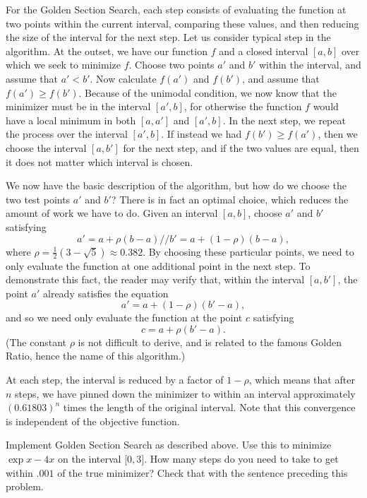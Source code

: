 For the Golden Section Search, each step consists of evaluating the function at two 
points within the current interval, comparing these values, and then reducing the size 
of the interval for the next step. Let us consider typical step in the algorithm. At 
the outset, we have our function $f$ and a closed interval $[a, b]$ over which we seek 
to minimize $f$. Choose two points $a'$ and $b'$ within the interval, and assume that 
$a' < b'$. Now calculate $f(a')$ and $f(b')$, and assume that $f(a') \geq f(b')$. 
Because of the unimodal condition, we now know that the minimizer must be in the 
interval $[a', b]$, for otherwise the function $f$ would have a local minimum in 
both $[a, a']$ and $[a', b]$. In the next step, we repeat the process over the interval 
$[a', b]$. If instead we had $f(b') \geq f(a')$, then we choose the interval $[a, b']$ 
for the next step, and if the two values are equal, then it does not matter which 
interval is chosen.

We now have the basic description of the algorithm, but how do we choose the two test 
points $a'$ and $b'$? There is in fact an optimal choice, which reduces the amount of 
work we have to do. Given an interval $[a, b]$, choose $a'$ and $b'$ satisfying 
\begin{equation*}
a' = a + \rho(b - a) //
b' = a + (1 - \rho)(b - a),
\end{equation*}
where $\rho = \frac{1}{2}(3 - \sqrt{5}) \approx 0.382$. By choosing these particular 
points, we need to only evaluate the function at one additional point in the next step. 
To demonstrate this fact, the reader may verify that, within the interval $[a, b']$, 
the point $a'$ already satisfies the equation 
\begin{equation*}
a' = a + (1 - \rho)(b' - a),
\end{equation*}
and so we need only evaluate the function at the point $c$ satisfying 
\begin{equation*}
c = a + \rho(b' - a).
\end{equation*}
(The constant $\rho$ is not difficult to derive, and is related to the famous Golden Ratio, hence the name of this algorithm.)

At each step, the interval is reduced by a factor of $1-\rho$, which means that after 
$n$ steps, we have pinned down the minimizer to within an interval approximately 
$(0.61803)^n$ times the length of the original interval. Note that this convergence is 
independent of the objective function.

\begin{problem}
Implement Golden Section Search as described above. Use this to minimize $\exp{x} - 4x$ 
on the interval $\lbrack 0, 3 \rbrack$. How many steps do you need to take to get 
within $.001$ of the true minimizer? Check that with the sentence preceding this 
problem.
\end{problem}

